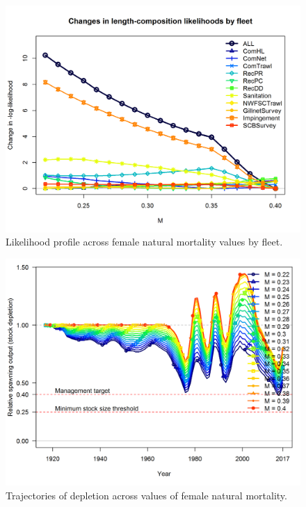 \documentclass[12pt,]{article}
\begin{document}
\begin{figure}[htbp]
\centering
\includegraphics{Figures/profile_m_piner.png}
\caption{Likelihood profile across female natural mortality values by
fleet. \label{fig:profile_m_piner}}
\end{figure}

\begin{figure}[htbp]
\centering
\includegraphics{Figures/profile_m_depl.png}
\caption{Trajectories of depletion across values of female natural
mortality. \label{fig:profile_m_depl}}
\end{figure}

\FloatBarrier
\end{document}
